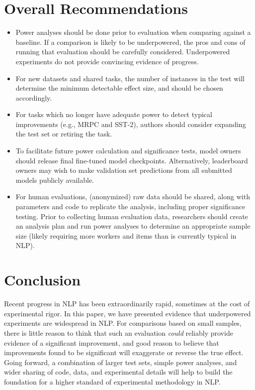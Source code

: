 \documentclass[11pt,a4paper]{article}
\begin{document}
\section{Overall Recommendations}

\begin{itemize}
    \item
    Power analyses should be done prior to evaluation when comparing against a baseline.
    If a comparison is likely to 
    be underpowered, the pros and cons of running that evaluation should be carefully considered. Underpowered experiments do not provide convincing evidence of progress.
    \item For new datasets and shared tasks, the number of instances in the test will determine the minimum detectable effect size, and should be chosen accordingly.
    \item For 
    tasks which no longer have adequate power to detect typical improvements
    (e.g., MRPC and SST-2), authors should consider expanding the test set or retiring the task.
    \item To facilitate future power calculation and significance tests, model owners should release final fine-tuned model checkpoints.
    Alternatively, leaderboard owners may wish to make validation set predictions from all submitted models publicly available. 
    \item For human evaluations,
    (anonymized) raw data should be shared, along with parameters and code to replicate the analysis,  including proper significance testing.
    Prior to collecting human evaluation
    data, researchers should create an analysis plan and run power analyses to determine an appropriate sample size (likely requiring more workers and items than is currently typical in NLP).
\end{itemize}

\section{Conclusion}

Recent progress in NLP has been extraordinarily rapid, sometimes at the cost of experimental rigor. In this paper, we have presented evidence that underpowered experiments are widespread in NLP.
For comparisons based on small samples, there is little reason to think that such an evaluation \textit{could} reliably provide evidence of a significant improvement, and good reason to believe that improvements found to be significant will exaggerate or reverse the true effect.  
Going forward, a combination of larger test sets, simple power analyses, and wider sharing of code, data, and experimental details will help to build the foundation for a higher standard of experimental methodology in NLP.
\end{document}
